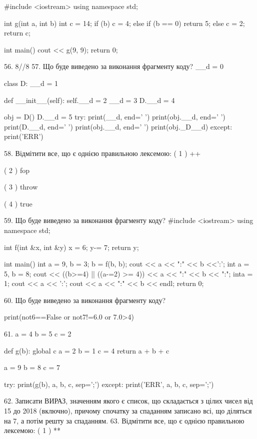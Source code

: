 \documentclass[11pt]{article}
\begin{document}
#include <iostream>
using namespace std;

int g(int a, int b){
    int c = 14;
    if (b)
        c = 4;
    else if (b == 0)
         return 5;
    else 
        c = 2;
    return c;
}

int main(){
    cout << g(9, 9);
    return 0;
}

56. 
8//8%
57. Що буде виведено за виконання фрагменту коду?
__d = 0

class D:
    __d = 1
    
    def __init__(self):
        self.__d = 2
        __d = 3
        D.__d = 4

obj = D()
D.__d = 5
try:
    print(__d, end=' ')
    print(obj.__d, end=' ')
    print(D.__d, end=' ')
    print(obj.__d, end=' ')
    print(obj._D__d)
except:
    print('ERR')

58. %
Відмітити все, що є однією правильною лексемою:
( 1 ) ++

( 2 ) fop

( 3 ) throw

( 4 ) true

59. Що буде виведено за виконання фрагменту коду?
#include <iostream>
using namespace std;

int f(int &x, int &y){
    x = 6;
    y-= 7;
    return y;
}

int main(){
    int a = 9, b = 3;
    b = f(b, b);
    cout << a << ":" << b <<':';
    {
        int a = 5, b = 8;
        cout << ((b>=4) || ((a-=2) >= 4))
             << a << ":" << b << ":";
    }
    {
        inta = 1;
        cout << a << ':';
    }
    cout << a << ":" << b << endl;
    return 0;
}


60. Що буде виведено за виконання фрагменту коду?

print(not6==False or not7!=6.0 or 7.0>4)

61. 
a = 4
b = 5
c = 2

def g(b):
global c    a = 2
    b = 1
    c = 4
    return a + b + c

a = 9
b = 8
c = 7

try:
    print(g(b), a, b, c, sep=';')
except:
    print('ERR', a, b, c, sep=';')

62. 
Записати ВИРАЗ, значенням якого є список, що складається з цілих чисел від 15 до 2018 (включно), причому спочатку за спаданням записано всі, що діляться на 7, а потім решту за спаданням.
63. %
Відмітити все, що є однією правильною лексемою:
( 1 ) **
\end{document}
